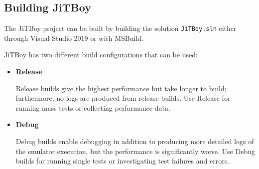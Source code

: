 \subsection{Building JiTBoy}

The JiTBoy project can be built by building the solution \texttt{JiTBoy.sln} either through Visual Studio 2019 or with MSBuild.

JiTBoy has two different build configurations that can be used:

\begin{itemize}
    \item \textbf{Release}
    
    Release builds give the highest performance but take longer to build; furthermore, no logs are produced from release builds. Use Release for running mass tests or collecting performance data.

    \item \textbf{Debug}
    
    Debug builds enable debugging in addition to producing more detailed logs of the emulator execution, but the performance is significantly worse. Use Debug builds for running single tests or investigating test failures and errors.

\end{itemize}